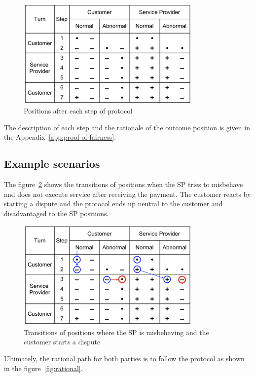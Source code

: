 \documentclass{ieeeaccess}
\begin{document}
\begin{figure}[h!]
\includegraphics[width=9cm]{formal-table-of-positions.png}
\centering
\caption{Positions after each step of protocol}
\label{fig:positions}
\end{figure}

The description of each step and the rationale of the outcome position is given in the Appendix~\ref{app:proof-of-fairness}.

\subsection{Example scenarios}\label{example-scenarios}

The figure~\ref{fig:misbehaviour} shows the transitions of positions when the SP tries to misbehave and does not execute service after receiving the payment. The customer reacts by starting a dispute and the protocol ends up neutral to the customer and disadvantaged to the SP positions.

\begin{figure}[h!]
\includegraphics[width=9cm]{formal-misbehaviour-path.png}
\centering
\caption{Transitions of positions where the SP is misbehaving and the customer starts a dispute}
\label{fig:misbehaviour}
\end{figure}

Ultimately, the rational path for both parties is to follow the protocol as shown in the figure~\ref{fig:rational}.
\end{document}
